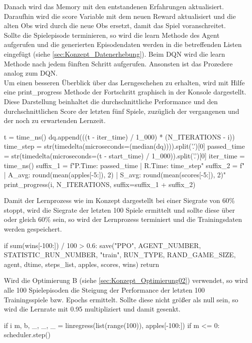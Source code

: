 Danach wird das Memory mit den entstandenen Erfahrungen aktualisiert. Daraufhin wird die score Variable mit dem neuen Reward aktualisiert und die alten Obs wird durch die neue Obs ersetzt, damit das Spiel voranschreitet.\\
Sollte die Spielepisode terminieren, so wird die learn Methode des Agent aufgerufen und die generierten Episodendaten werden in die betreffenden Listen eingefügt (siehe \ref{sec:Konzept_Datenerhebung}). Beim DQN wird die learn Methode nach jedem fünften Schritt aufgerufen. Ansonsten ist das Prozedere analog zum DQN.\\
Um einen besseren Überblick über das Lerngeschehen zu erhalten, wird mit Hilfe eine print\_progress Methode der Fortschritt graphisch in der Konsole dargestellt. Diese Darstellung beinhaltet die durchschnittliche Performance und den durchschnittlichen Score der letzten fünf Spiele, zuzüglich der vergangenen und der noch zu erwartenden Lernzeit.
\begin{python}
	t = time_ns()
	dq.append(((t - iter_time) / 1_000) * (N_ITERATIONS - i))
	time_step = str(timedelta(microseconds=(median(dq)))).split('.')[0]
	passed_time = str(timedelta(microseconds=(t - start_time) / 1_000)).split('.')[0]
	iter_time = time_ns()
	suffix_1 = f"P.Time: {passed_time} | R.Time: {time_step}"
	suffix_2 = f" | A_avg: {round(mean(apples[-5:]), 2)} |
							S_avg: {round(mean(scores[-5:]), 2)}"
	print_progress(i, N_ITERATIONS, suffix=suffix_1 + suffix_2)
\end{python}
Damit der Lernprozess wie im Konzept dargestellt bei einer Siegrate von 60\% stoppt, wird die Siegrate der letzten 100 Spiele ermittelt und sollte diese über oder gleich 60\% sein, so wird der Lernprozess terminiert und die Trainingsdaten werden gespeichert.
\begin{python}
	if sum(wins[-100:]) / 100 > 0.6:
		save("PPO", AGENT_NUMBER, STATISTIC_RUN_NUMBER, "train",
				 RUN_TYPE, RAND_GAME_SIZE, agent, dtime, steps_list, apples,
				  scores, wins)
    return
\end{python}
Wird die Optimierung B (siehe \ref{sec:Konzept_Optimierung02}) verwendet, so wird alle 100 Spielepisoden die Steigung der Performance der letzten 100 Trainingsspiele bzw. Epochs ermittelt. Sollte diese nicht größer als null sein, so wird die Lernrate mit 0.95 multipliziert und damit gesenkt.
\begin{python}
	if i %
		m, b, _, _, _ = linregress(list(range(100)), apples[-100:])
		if m <= 0:
			scheduler.step()
\end{python}
